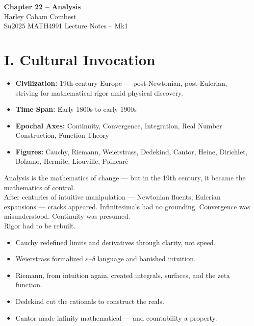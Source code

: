 \documentclass[9pt]{article}
\begin{document}
\begin{center}
\Large\textbf{Chapter 22 – Analysis} \\
\large Harley Caham Combest \\
\large Su2025 MATH4991 Lecture Notes – Mk1
\end{center}

\vspace{1em}

\section*{I. Cultural Invocation}

\begin{itemize}
  \item \textbf{Civilization:} 19th-century Europe — post-Newtonian, post-Eulerian, striving for mathematical rigor amid physical discovery.
  \item \textbf{Time Span:} Early 1800s to early 1900s
  \item \textbf{Epochal Axes:} Continuity, Convergence, Integration, Real Number Construction, Function Theory
  \item \textbf{Figures:} Cauchy, Riemann, Weierstrass, Dedekind, Cantor, Heine, Dirichlet, Bolzano, Hermite, Liouville, Poincaré
\end{itemize}

\noindent
Analysis is the mathematics of change —  
but in the 19th century, it became the mathematics of control.\\

\noindent
After centuries of intuitive manipulation — Newtonian fluents, Eulerian expansions — cracks appeared.  
Infinitesimals had no grounding. Convergence was misunderstood. Continuity was presumed.\\

Rigor had to be rebuilt.

\begin{itemize}
  \item Cauchy redefined limits and derivatives through clarity, not speed.
  \item Weierstrass formalized $\varepsilon$–$\delta$ language and banished intuition.
  \item Riemann, from intuition again, created integrals, surfaces, and the zeta function.
  \item Dedekind cut the rationals to construct the reals.
  \item Cantor made infinity mathematical — and countability a property.
\end{itemize}
\end{document}
